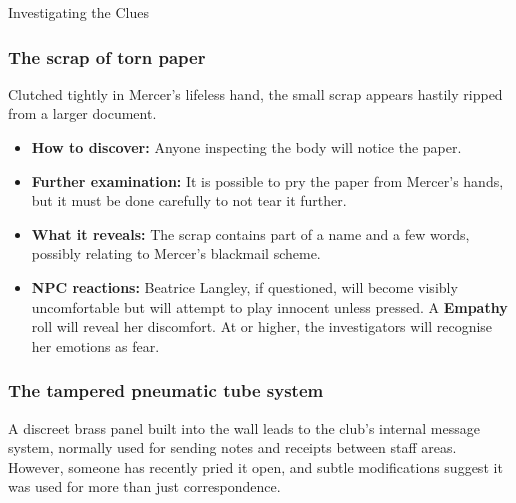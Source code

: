 \begin{WyrdComment}{Investigating the Clues}
	\subsubsection*{The scrap of torn paper}
	Clutched tightly in Mercer’s lifeless hand, the small scrap appears hastily ripped from a larger document.
	\begin{itemize}
		\item \textbf{How to discover:} Anyone inspecting the body will notice the paper.
		\item \textbf{Further examination:} It is possible to pry the paper from Mercer's hands, but it must be done carefully to not tear it further.
		\item \textbf{What it reveals:} The scrap contains part of a name and a few words, possibly relating to Mercer's blackmail scheme.
		\item \textbf{NPC reactions:} Beatrice Langley, if questioned, will become visibly uncomfortable but will attempt to play innocent unless pressed. A \Basic \textbf{Empathy} roll will reveal her discomfort. At \Formidable or higher, the investigators will recognise her emotions as fear.
	\end{itemize}
	
	\subsubsection*{The tampered pneumatic tube system}
	A discreet brass panel built into the wall leads to the club’s internal message system, normally used for sending notes and receipts between staff areas. However, someone has recently pried it open, and subtle modifications suggest it was used for more than just correspondence.


\end{WyrdComment}
